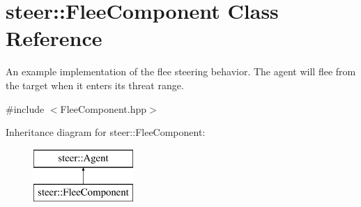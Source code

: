 \hypertarget{classsteer_1_1_flee_component}{\section{steer\-:\-:Flee\-Component Class Reference}
\label{classsteer_1_1_flee_component}
}


An example implementation of the flee steering behavior. The agent will flee from the target when it enters its threat range.  




{\ttfamily \#include $<$Flee\-Component.\-hpp$>$}

Inheritance diagram for steer\-:\-:Flee\-Component\-:\begin{figure}[H]
\begin{center}
\leavevmode
\includegraphics[height=2.000000cm]{classsteer_1_1_flee_component}
\end{center}
\end{figure}

